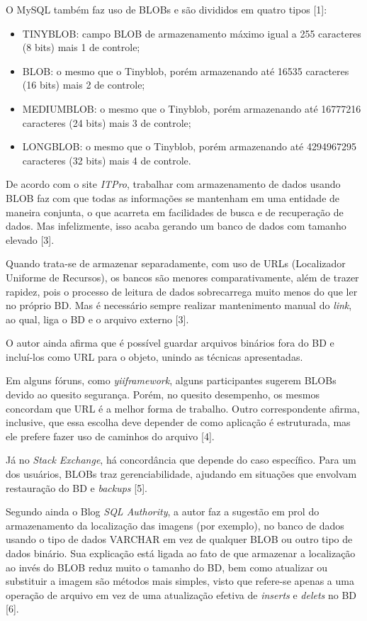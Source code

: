\documentclass[12pt,a4paper]{article}
\begin{document}
O MySQL também faz uso de BLOBs e são divididos em quatro tipos [1]:
\begin{itemize}
	\item TINYBLOB: campo BLOB de armazenamento máximo igual a 255 caracteres (8 bits) mais 1 de controle;
	\item BLOB: o mesmo que o Tinyblob, porém armazenando até 16535 caracteres (16 bits) mais 2 de controle;
	\item MEDIUMBLOB: o mesmo que o Tinyblob, porém armazenando até 16777216 caracteres (24 bits) mais 3 de controle;
	\item LONGBLOB: o mesmo que o Tinyblob, porém armazenando até 4294967295 caracteres (32 bits) mais 4 de controle.
\end{itemize}

De acordo com o site \textit{ITPro}, trabalhar com armazenamento de dados usando BLOB faz com que todas as informações se mantenham em uma entidade de maneira conjunta, o que acarreta em facilidades de busca e de recuperação de dados. Mas infelizmente, isso acaba gerando um banco de dados com tamanho elevado [3]. 

Quando trata-se de armazenar separadamente, com uso de URLs (Localizador Uniforme de Recursos), os bancos são menores comparativamente, além de trazer rapidez, pois o processo de leitura de dados sobrecarrega muito menos do que ler no próprio BD. Mas é necessário sempre realizar mantenimento manual do \textit{link}, ao qual, liga o BD e o arquivo externo [3].

O autor ainda afirma que é possível guardar arquivos binários fora do BD e incluí-los como URL para o objeto, unindo as técnicas apresentadas.

Em alguns fóruns, como \textit{yiiframework}, alguns participantes sugerem BLOBs devido ao quesito segurança. Porém, no quesito desempenho, os mesmos concordam que URL é a melhor forma de trabalho. Outro correspondente afirma, inclusive, que essa escolha deve depender de como aplicação é estruturada, mas ele prefere fazer uso de caminhos do arquivo [4].

Já no \textit{Stack Exchange}, há concordância que depende do caso específico. Para um dos usuários, BLOBs traz gerenciabilidade, ajudando em situações que envolvam restauração do BD e \textit{backups} [5]. 

Segundo ainda o Blog \textit{SQL Authority}, a autor faz a sugestão em prol do armazenamento da localização das imagens (por exemplo), no banco de dados usando o tipo de dados VARCHAR em vez de qualquer BLOB ou outro tipo de dados binário. Sua explicação está ligada ao fato de que armazenar a localização ao invés do BLOB reduz muito o tamanho do BD, bem como atualizar ou substituir a imagem são métodos mais simples, visto que refere-se apenas a uma operação de arquivo em vez de uma atualização efetiva de \textit{inserts} e \textit{delets} no BD [6].
\end{document}
